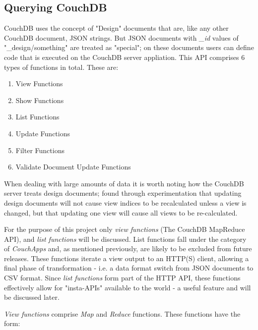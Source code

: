 
\subsection{Querying CouchDB}

CouchDB uses the concept of "Design" documents that are, like any other CouchDB document, JSON strings. But JSON documents with \textit{_id} values of "\_design/\<something\>" are treated as "special"; on these documents users can define code that is executed on the CouchDB server appliation. This API comprises 6 types of functions in total. These are:

\begin{enumerate}
    \item View Functions
    \item Show Functions
    \item List Functions
    \item Update Functions
    \item Filter Functions
    \item Validate Document Update Functions
\end{enumerate}

When dealing with large amounts of data it is worth noting how the CouchDB server treats design documents; \cite{Sharma2014} found through experimentation that updating design documents will not cause view indices to be recalculated unless a view is changed, but that updating one view will cause all views to be re-calculated.

For the purpose of this project only \textit{view functions} (The CouchDB MapReduce API), and \textit{list functions} will be discussed. List functions fall under the category of \textit{CouchApps} and, as mentioned previously, are likely to be excluded from future releases. These functions iterate a view output to an HTTP(S) client, allowing a final phase of transformation - i.e. a data format switch from JSON documents to CSV format. Since \textit{list functions} form part of the HTTP API, these functions effectively allow for "insta-APIs" available to the world - a useful feature and will be discussed later.

\textit{View functions} comprise \textit{Map} and \textit{Reduce} functions. These functions have the form:

